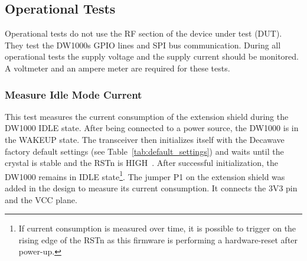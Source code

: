 \documentclass[journal,comsoc]{IEEEtran}
\begin{document}
\subsection{Operational Tests}
Operational tests do not use the RF section of the device under test (DUT). They test the DW1000s GPIO lines and SPI bus communication. 
During all operational tests the supply voltage and the supply current should be monitored. A voltmeter and an ampere meter are required for these tests. 

\vspace*{1em}
\subsubsection{Measure Idle Mode Current}
\label{subsubsec:idlecurrent}
This test measures the current consumption of the extension shield during the DW1000 IDLE state. 
After being connected to a power source, the DW1000 is in the WAKEUP state. 
The transceiver then initializes itself with the Decawave factory default settings (see Table~\ref{tab:default_settings}) and waits until the crystal is stable and the RSTn is HIGH~\cite[Section 2.3]{dw1000um}. 
After successful initialization, the DW1000 remains in IDLE state\footnote{If current consumption is measured over time, it is possible to trigger on the rising edge of the RSTn as this firmware is performing a hardware-reset after power-up.}.
The jumper P1 on the extension shield was added in the design to measure its current consumption. It connects the 3V3 pin and the VCC plane.
\end{document}
